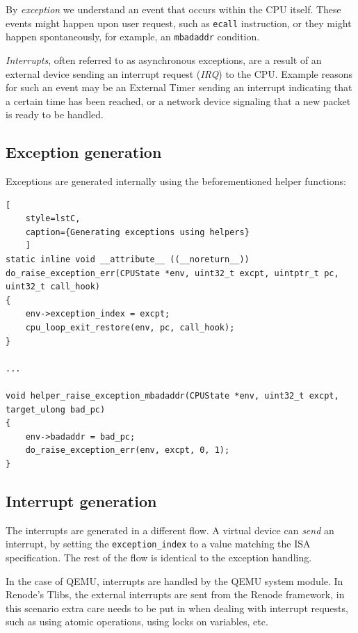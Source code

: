 By \textit{exception} we understand an event that occurs within the CPU itself. These events might happen upon user request, such
as \texttt{ecall} instruction, or they might happen spontaneously, for example, an \texttt{mbadaddr} condition.

\textit{Interrupts}, often referred to as asynchronous exceptions, are a result of an external device sending an
interrupt request (\textit{IRQ}) to the CPU. Example reasons for such an event may be an External Timer sending an interrupt indicating that 
a certain time has been reached, or a network device signaling that a new packet is ready to be handled.

\pagebreak
\subsection*{Exception generation}
Exceptions are generated internally using the beforementioned helper functions:

\begin{lstlisting}[
    style=lstC,
    caption={Generating exceptions using helpers}
    ]
static inline void __attribute__ ((__noreturn__))
do_raise_exception_err(CPUState *env, uint32_t excpt, uintptr_t pc, uint32_t call_hook)
{
    env->exception_index = excpt;
    cpu_loop_exit_restore(env, pc, call_hook);
}

...

void helper_raise_exception_mbadaddr(CPUState *env, uint32_t excpt, target_ulong bad_pc)
{
    env->badaddr = bad_pc;
    do_raise_exception_err(env, excpt, 0, 1);
}
\end{lstlisting}

\subsection*{Interrupt generation}
The interrupts are generated in a different flow. A virtual device can \textit{send} an interrupt, by setting the
\texttt{exception\_index} to a value matching the ISA specification. The rest of the flow is identical to the exception
handling.

In the case of QEMU, interrupts are handled by the QEMU system module. In Renode's Tlibs, the external
interrupts are sent from the Renode framework, in this scenario extra care needs to be put in when dealing with
interrupt requests, such as using atomic operations, using locks on variables, etc.

